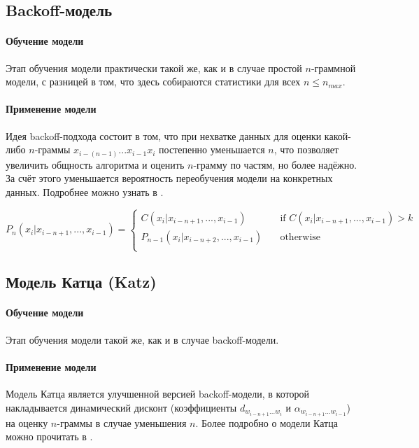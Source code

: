 \subsection{ Backoff-модель } 

\paragraph{ Обучение модели } Этап обучения модели практически такой же, как и в случае простой $n$-граммной модели, с разницей в том, что здесь собираются статистики для всех $n \leq n_{max}$.

\paragraph{ Применение модели } Идея backoff-подхода состоит в том, что при нехватке данных для оценки какой-либо $n$-граммы $x_{i - (n - 1)} ... x_{i - 1} x_i$ постепенно уменьшается $n$, что позволяет увеличить общность алгоритма и оценить $n$-грамму по частям, но более надёжно. За счёт этого уменьшается вероятность переобучения модели на конкретных данных. Подробнее можно узнать в \cite{manning}.

\[ P_n(x_i | x_{i - n + 1}, ..., x_{i - 1}) =
\begin{cases}
	C(x_i | x_{i - n + 1}, ..., x_{i - 1})       & \quad \text{if } C(x_i | x_{i - n + 1}, ..., x_{i - 1}) > k\\
	P_{n - 1}(x_i | x_{i - n + 2}, ..., x_{i - 1})  & \quad \text{otherwise }\\
\end{cases}
\]

\subsection{ Модель Катца (Katz) }

\paragraph{ Обучение модели } Этап обучения модели такой же, как и в случае backoff-модели.

\paragraph{ Применение модели } Модель Катца является улучшенной версией backoff-модели, в которой накладывается динамический дисконт (коэффициенты $d_{w_{i-n+1}...w_i}$ и $\alpha_{w_{i-n+1}...w_{i-1}}$) на оценку $n$-граммы в случае уменьшения $n$. Более подробно о модели Катца можно прочитать в \cite{katz:backoff}.

